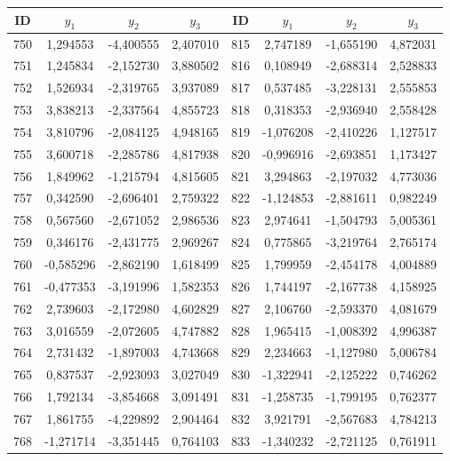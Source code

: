 \begin{apendicesenv}
\begin{table}[H]
	\centering
	\scriptsize
	\begin{tabular}{c c c c c c c c}
		\toprule
		 \centering \textbf{ID} & $y_1$ & $y_2$ & $y_3$ & \textbf{ID} & $y_1$ & $y_2$ & $y_3$ \\
		\midrule
		750 & 1,294553 & -4,400555 & 2,407010 & 815 & 2,747189 & -1,655190 & 4,872031 \\
		751 & 1,245834 & -2,152730 & 3,880502 & 816 & 0,108949 & -2,688314 & 2,528833 \\
		752 & 1,526934 & -2,319765 & 3,937089 & 817 & 0,537485 & -3,228131 & 2,555853 \\
		753 & 3,838213 & -2,337564 & 4,855723 & 818 & 0,318353 & -2,936940 & 2,558428 \\
		754 & 3,810796 & -2,084125 & 4,948165 & 819 & -1,076208 & -2,410226 & 1,127517 \\
		755 & 3,600718 & -2,285786 & 4,817938 & 820 & -0,996916 & -2,693851 & 1,173427 \\
		756 & 1,849962 & -1,215794 & 4,815605 & 821 & 3,294863 & -2,197032 & 4,773036 \\
		757 & 0,342590 & -2,696401 & 2,759322 & 822 & -1,124853 & -2,881611 & 0,982249 \\
		758 & 0,567560 & -2,671052 & 2,986536 & 823 & 2,974641 & -1,504793 & 5,005361 \\
		759 & 0,346176 & -2,431775 & 2,969267 & 824 & 0,775865 & -3,219764 & 2,765174 \\
		760 & -0,585296 & -2,862190 & 1,618499 & 825 & 1,799959 & -2,454178 & 4,004889 \\
		761 & -0,477353 & -3,191996 & 1,582353 & 826 & 1,744197 & -2,167738 & 4,158925 \\
		762 & 2,739603 & -2,172980 & 4,602829 & 827 & 2,106760 & -2,593370 & 4,081679 \\
		763 & 3,016559 & -2,072605 & 4,747882 & 828 & 1,965415 & -1,008392 & 4,996387 \\
		764 & 2,731432 & -1,897003 & 4,743668 & 829 & 2,234663 & -1,127980 & 5,006784 \\
		765 & 0,837537 & -2,923093 & 3,027049 & 830 & -1,322941 & -2,125222 & 0,746262 \\
		766 & 1,792134 & -3,854668 & 3,091491 & 831 & -1,258735 & -1,799195 & 0,762377 \\
		767 & 1,861755 & -4,229892 & 2,904464 & 832 & 3,921791 & -2,567683 & 4,784213 \\
		768 & -1,271714 & -3,351445 & 0,764103 & 833 & -1,340232 & -2,721125 & 0,761911 \\

\end{tabular}
\end{table}
\end{apendicesenv}
